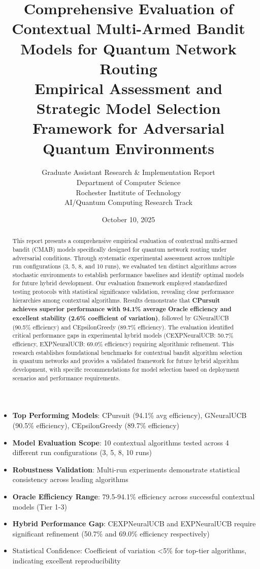 \documentclass[12pt,a4paper]{article}
\title{\textbf{Comprehensive Evaluation of Contextual Multi-Armed Bandit Models for Quantum Network Routing}\\
\large{Empirical Assessment and Strategic Model Selection Framework for Adversarial Quantum Environments}}
\author{Graduate Assistant Research \& Implementation Report\\ 
Department of Computer Science \\ 
Rochester Institute of Technology \\ 
AI/Quantum Computing Research Track}
\date{October 10, 2025}
\newcommand{\performance}[1]{\textcolor{performancecolor}{\textbf{#1}}}
\newcommand{\stochastic}[1]{\textcolor{stochasticcolor}{\textbf{#1}}}
\newcommand{\highlight}[1]{\colorbox{highlightcolor}{#1}}
\newcommand{\critical}[1]{\textcolor{criticalcolor}{\textbf{#1}}}
\newcommand{\success}[1]{\textcolor{successcolor}{\textbf{#1}}}
\begin{document}
\maketitle

\begin{abstract}
This report presents a comprehensive empirical evaluation of contextual multi-armed bandit (CMAB) models specifically designed for quantum network routing under adversarial conditions. Through systematic experimental assessment across multiple run configurations (3, 5, 8, and 10 runs), we evaluated ten distinct algorithms across stochastic environments to establish performance baselines and identify optimal models for future hybrid development. Our evaluation framework employed standardized testing protocols with statistical significance validation, revealing clear performance hierarchies among contextual algorithms. Results demonstrate that \textbf{CPursuit achieves superior performance with 94.1\% average Oracle efficiency and excellent stability (2.6\% coefficient of variation)}, followed by GNeuralUCB (90.5\% efficiency) and CEpsilonGreedy (89.7\% efficiency). The evaluation identified critical performance gaps in experimental hybrid models (CEXPNeuralUCB: 50.7\% efficiency, EXPNeuralUCB: 69.0\% efficiency) requiring algorithmic refinement. This research establishes foundational benchmarks for contextual bandit algorithm selection in quantum networks and provides a validated framework for future hybrid algorithm development, with specific recommendations for model selection based on deployment scenarios and performance requirements.
\end{abstract}

\newpage
{\scriptsize\tableofcontents}

\newpage

\begin{tcolorbox}[colback=highlightcolor!30,colframe=performancecolor,title=\textbf{Key Experimental Results Summary}]
\begin{itemize}
\item \performance{Top Performing Models}: CPursuit (94.1\% avg efficiency), GNeuralUCB (90.5\% efficiency), CEpsilonGreedy (89.7\% efficiency)
\item \stochastic{Model Evaluation Scope}: 10 contextual algorithms tested across 4 different run configurations (3, 5, 8, 10 runs)  
\item \success{Robustness Validation}: Multi-run experiments demonstrate statistical consistency across leading algorithms
\item \performance{Oracle Efficiency Range}: 79.5-94.1\% efficiency across successful contextual models (Tier 1-3)
\item \critical{Hybrid Performance Gap}: CEXPNeuralUCB and EXPNeuralUCB require significant refinement (50.7\% and 69.0\% efficiency respectively)
\item \highlight{Statistical Confidence}: Coefficient of variation <5\% for top-tier algorithms, indicating excellent reproducibility
\end{itemize}
\end{tcolorbox}
\end{document}
